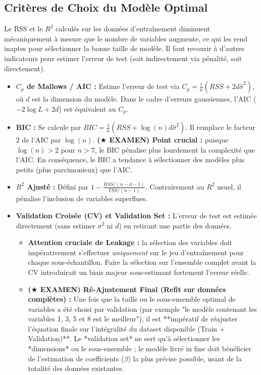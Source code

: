 \subsection{Critères de Choix du Modèle Optimal}
Le RSS et le $R^2$ calculés sur les données d'entraînement diminuent mécaniquement à mesure que le nombre de variables augmente, ce qui les rend inaptes pour sélectionner la bonne taille de modèle. Il faut recourir à d'autres indicateurs pour estimer l'erreur de test (soit indirectement via pénalité, soit directement).

\begin{itemize}
    \item \textbf{$C_p$ de Mallows / AIC :} Estime l'erreur de test via $C_p = \frac{1}{n} (RSS + 2 d \hat{\sigma}^2)$, où $d$ est la dimension du modèle. Dans le cadre d'erreurs gaussiennes, l'AIC ($-2 \log L + 2d$) est équivalent au $C_p$.
    \item \textbf{BIC :} Se calcule par $BIC = \frac{1}{n} (RSS + \log(n) d \hat{\sigma}^2)$. Il remplace le facteur $2$ de l'AIC par $\log(n)$. \textbf{($\bigstar$ EXAMEN) Point crucial :} puisque $\log(n) > 2$ pour $n > 7$, le BIC pénalise plus lourdement la complexité que l'AIC. En conséquence, le BIC a tendance à sélectionner des modèles plus petits (plus parcimonieux) que l'AIC.
    \item \textbf{$R^2$ Ajusté :} Défini par $1 - \frac{RSS / (n - d - 1)}{TSS / (n - 1)}$. Contrairement au $R^2$ usuel, il pénalise l'inclusion de variables superflues.
    \item \textbf{Validation Croisée (CV) et Validation Set :} L'erreur de test est estimée directement (sans estimer $\sigma^2$ ni $d$) en retirant une partie des données. 
    \begin{itemize}
        \item \textbf{Attention cruciale de Leakage :} la sélection des variables doit impérativement s'effectuer \textit{uniquement} sur le jeu d'entraînement pour chaque sous-échantillon. Faire la sélection sur l'ensemble complet avant la CV introduirait un biais majeur sous-estimant fortement l'erreur réelle.
        \item \textbf{($\bigstar$ EXAMEN) Ré-Ajustement Final (Refit sur données complètes) :} Une fois que la taille ou le sous-ensemble optimal de variables a été choisi par validation (par exemple "le modèle contenant les variables 1, 3, 5 et 8 est le meilleur"), il est **impératif de réajuster l'équation finale sur l'intégralité du dataset disponible (Train + Validation)**. Le *validation set* ne sert qu'à sélectionner les *dimensions* ou le sous-ensemble ; le modèle livré in fine doit bénéficier de l'estimation de coefficients ($\beta$) la plus précise possible, usant de la totalité des données existantes.
    \end{itemize}
\end{itemize}

